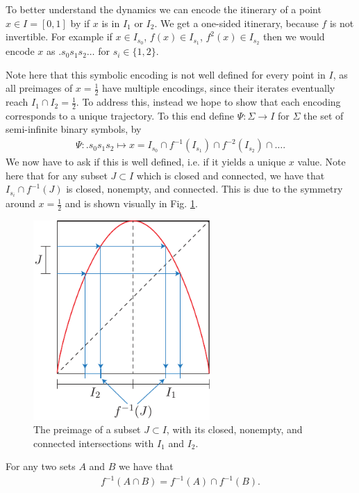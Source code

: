\begin{ex}
To better understand the dynamics we can encode the itinerary of a point $x\in I=[0,1]$ by if $x$ is in $I_{1}$ or $I_{2}$. We get a one-sided itinerary, because $f$ is not invertible. For example if $x\in I_{s_0}$, $f(x)\in I_{s_1}$, $f^{2}(x)\in I_{s_2}$ then we would encode $x$ as $\bm{.} s_0s_1s_2\ldots$ for $s_i \in \{ 1,2\}$.

Note here that this symbolic encoding is not well defined for every point in $I$, as all preimages of $x=\frac{1}{2}$ have multiple encodings, since their iterates eventually reach $I_{1}\cap I_{2} =\frac{1}{2}$. To address this, instead we hope to show that each encoding corresponds to a unique trajectory. To this end define $\Psi:\Sigma \to I$ for $\Sigma$ the set of semi-infinite binary symbols, by
\begin{align}
	\Psi: \bm{.} s_0s_1s_2 \mapsto x = I_{s_0} \cap f^{-1}(I_{s_1}) \cap f^{-2}(I_{s_2}) \cap \ldots.
\end{align}
We now have to ask if this is well defined, i.e. if it yields a unique $x$ value. Note here that for any subset $J\subset I$ which is closed and connected, we have that $I_{s_i}\cap f^{-1}(J)$ is closed, nonempty, and connected. This is due to the symmetry around $x=\frac{1}{2}$ and is shown visually in Fig. \ref{fig:J_preimage}.
\begin{figure}[h!]
	\centering
	\includegraphics[width=0.6\textwidth]{figures/ch6/24J_preimage.pdf}
	\caption{The preimage of a subset $J\subset I$, with its closed, nonempty, and connected intersections with $I_1$ and $I_2$.}
	\label{fig:J_preimage}
\end{figure}

\begin{remark}[]
	For any two sets $A$ and $B$ we have that 
	\begin{align}
		f^{-1}(A \cap B) = f^{-1}(A) \cap f^{-1}(B).
	\end{align}
\end{remark}


\end{ex}
